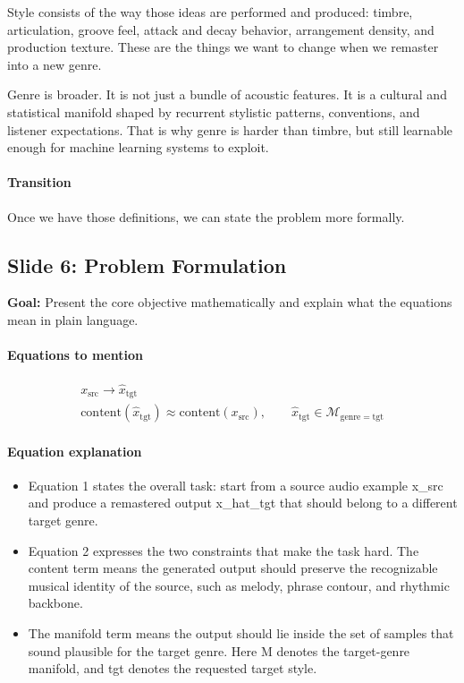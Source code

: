 \documentclass[11pt]{article}
\begin{document}
Style consists of the way those ideas are performed and produced: timbre, articulation, groove feel, attack and decay behavior, arrangement density, and production texture. These are the things we want to change when we remaster into a new genre.

Genre is broader. It is not just a bundle of acoustic features. It is a cultural and statistical manifold shaped by recurrent stylistic patterns, conventions, and listener expectations. That is why genre is harder than timbre, but still learnable enough for machine learning systems to exploit.

\paragraph{Transition}
Once we have those definitions, we can state the problem more formally.

\subsection*{Slide 6: Problem Formulation}
\textbf{Goal:} Present the core objective mathematically and explain what the equations mean in plain language.
\paragraph{Equations to mention}
\begin{align*}
x_{\mathrm{src}} \rightarrow \hat{x}_{\mathrm{tgt}}\\
\mathrm{content}(\hat{x}_{\mathrm{tgt}}) \approx \mathrm{content}(x_{\mathrm{src}}), \qquad \hat{x}_{\mathrm{tgt}} \in \mathcal{M}_{\mathrm{genre=tgt}}
\end{align*}
\paragraph{Equation explanation}
\begin{itemize}
\item Equation 1 states the overall task: start from a source audio example x\_src and produce a remastered output x\_hat\_tgt that should belong to a different target genre.
\item Equation 2 expresses the two constraints that make the task hard. The content term means the generated output should preserve the recognizable musical identity of the source, such as melody, phrase contour, and rhythmic backbone.
\item The manifold term means the output should lie inside the set of samples that sound plausible for the target genre. Here M denotes the target-genre manifold, and tgt denotes the requested target style.
\end{itemize}
\end{document}
